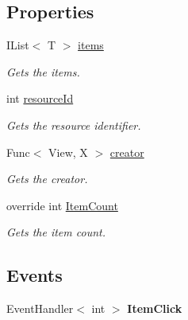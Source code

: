 \subsection*{Properties}
\begin{DoxyCompactItemize}
\item 
I\+List$<$ T $>$ \hyperlink{class_w_c_c_mobile_1_1_adapters_1_1_generic_adapter_a7d82f417d14c6d0027dfb56cd3361c76}{items}
\begin{DoxyCompactList}\small\item\em Gets the items. \end{DoxyCompactList}\item 
int \hyperlink{class_w_c_c_mobile_1_1_adapters_1_1_generic_adapter_a2adf5c93b6f5abaf8c51e28a9a91c6d3}{resource\+Id}
\begin{DoxyCompactList}\small\item\em Gets the resource identifier. \end{DoxyCompactList}\item 
Func$<$ View, X $>$ \hyperlink{class_w_c_c_mobile_1_1_adapters_1_1_generic_adapter_ad2341fe4f922682e52dc4d86f397868f}{creator}
\begin{DoxyCompactList}\small\item\em Gets the creator. \end{DoxyCompactList}\item 
override int \hyperlink{class_w_c_c_mobile_1_1_adapters_1_1_generic_adapter_a6d805fdca94bdf6d91bd4cad6998cb32}{Item\+Count}
\begin{DoxyCompactList}\small\item\em Gets the item count. \end{DoxyCompactList}\end{DoxyCompactItemize}
\subsection*{Events}
\begin{DoxyCompactItemize}
\item 
Event\+Handler$<$ int $>$ {\bfseries Item\+Click}\hypertarget{class_w_c_c_mobile_1_1_adapters_1_1_generic_adapter_a9f45547a182d73bc6ea90949c8fb40a1}{}\label{class_w_c_c_mobile_1_1_adapters_1_1_generic_adapter_a9f45547a182d73bc6ea90949c8fb40a1}

\end{DoxyCompactItemize}


